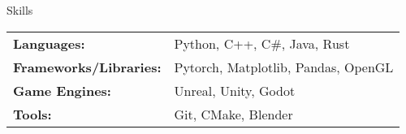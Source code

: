 \documentclass{resume} %
\begin{document}
\begin{rSection}{Skills}
    \begin{tabular}{>{\bfseries}l l} %
        Languages: & Python, C++, C\#, Java, Rust \\
        Frameworks/Libraries: & Pytorch, Matplotlib, Pandas, OpenGL \\
        Game Engines: & Unreal, Unity, Godot \\
        Tools: & Git, CMake, Blender \\
    \end{tabular}
\end{rSection}
\end{document}
